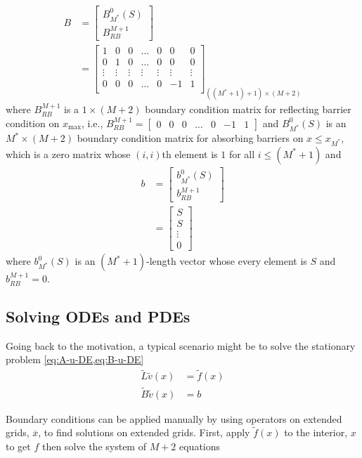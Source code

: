 \documentclass[11pt]{article}
\theoremstyle{definition}
\begin{document}
\begin{align}
B &=
\begin{bmatrix}
B_{M^*}^0 (S) \\ 
B_{RB}^{M+1}
\end{bmatrix}
\\
&=
\begin{bmatrix}
1 & 0 & 0 & \dots & 0 & 0 & 0 \\
0 & 1 & 0 & \dots & 0 & 0 & 0 \\
\vdots & \vdots & \vdots & \vdots & \vdots & \vdots & \vdots \\
0 & 0 & 0 & \dots & 0 & -1 & 1\\
\end{bmatrix}_{((M^* + 1) + 1) \times (M+2)} 
\end{align}
where $B_{RB}^{M+1}$ is a $1 \times (M+2)$ boundary condition matrix for reflecting barrier condition on $x_{\max}$, i.e., $B_{RB}^{M+1} = \begin{bmatrix}
0& 0& 0 &\dots & 0 & -1 & 1
\end{bmatrix}$ and $B_{M^*}^0 (S)$ is an $M^* \times (M+2)$ boundary condition matrix for absorbing barriers on $x \leq x_{M^*}$, which is a zero matrix whose $(i,i)$th element is $1$ for all $i \leq (M^* + 1)$ and
\begin{align}
b &= \begin{bmatrix}
b_{M^*}^0 (S) \\ 
b_{RB}^{M+1}
\end{bmatrix}\\
&= \begin{bmatrix}
S \\
S \\
\vdots \\
0
\end{bmatrix}
\end{align}
where $b^0_{M^*} (S)$ is an $(M^* + 1)$-length vector whose every element is $S$ and $b_{RB}^{M+1} = 0$.

\subsection{Solving ODEs and PDEs}
Going back to the motivation, a typical scenario might be to solve the stationary problem \cref{eq:A-u-DE,eq:B-u-DE}
\begin{align}
	\tilde{L} \tilde{v}(x) &= \tilde{f}(x)\\
	\tilde{B} \tilde{v}(x) &= b
\end{align}

Boundary conditions can be applied manually by using operators on extended grids, $\overline{x}$, to find solutions on extended grids.  First, apply $\tilde{f}(x)$ to the interior, $x$ to get  $f$ then solve the system of $M+2$ equations
\end{document}
